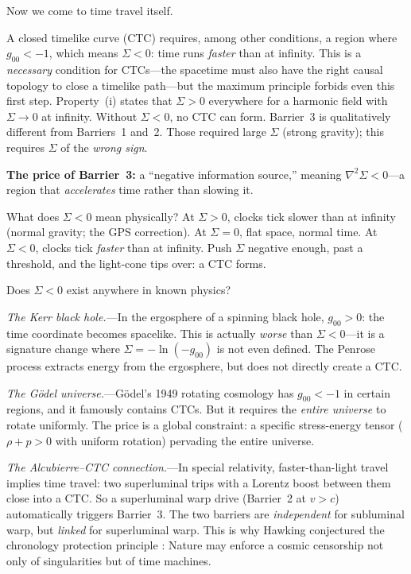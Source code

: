 \documentclass[12pt]{article}
\begin{document}
Now we come to time travel itself.

A closed timelike curve (CTC) requires, among other conditions, a
region where $g_{00} < -1$, which means $\Sigma < 0$: time runs
\emph{faster} than at infinity. This is a \emph{necessary} condition
for CTCs---the spacetime must also have the right causal topology to
close a timelike path---but the maximum principle forbids even this
first step. Property~(i) states that $\Sigma > 0$ everywhere for a
harmonic field with $\Sigma \to 0$ at infinity. Without $\Sigma < 0$,
no CTC can form. Barrier~3 is qualitatively different from Barriers~1
and~2. Those required large $\Sigma$ (strong gravity); this requires
$\Sigma$ of the \emph{wrong sign}.




\noindent\textbf{The price of Barrier~3:} a ``negative information
source,'' meaning $\nabla^2\Sigma < 0$---a region that \emph{accelerates}
time rather than slowing it.



What does $\Sigma < 0$ mean physically? At $\Sigma > 0$, clocks tick
slower than at infinity (normal gravity; the GPS correction). At
$\Sigma = 0$, flat space, normal time. At $\Sigma < 0$, clocks tick
\emph{faster} than at infinity. Push $\Sigma$ negative enough, past a
threshold, and the light-cone tips over: a CTC forms.

Does $\Sigma < 0$ exist anywhere in known physics?

\emph{The Kerr black hole.}---In the ergosphere of a spinning black
hole, $g_{00} > 0$: the time coordinate becomes spacelike. This is
actually \emph{worse} than $\Sigma < 0$---it is a signature change where
$\Sigma = -\ln(-g_{00})$ is not even defined. The Penrose process
extracts energy from the ergosphere, but does not directly create a CTC.

\emph{The G\"odel universe.}---G\"odel's 1949 rotating cosmology
\cite{Goedel1949} has $g_{00} < -1$ in certain regions, and it
famously contains CTCs. But it requires the \emph{entire universe} to
rotate uniformly. The price is a global constraint: a specific stress-energy tensor ($\rho + p > 0$ with uniform rotation) pervading the entire universe.

\emph{The Alcubierre--CTC connection.}---In special relativity,
faster-than-light travel implies time travel: two superluminal trips
with a Lorentz boost between them close into a CTC. So a superluminal
warp drive (Barrier~2 at $v > c$) automatically triggers Barrier~3.
The two barriers are \emph{independent} for subluminal warp, but
\emph{linked} for superluminal warp. This is why Hawking conjectured
the chronology protection principle \cite{Hawking1992}: Nature may
enforce a cosmic censorship not only of singularities but of time
machines.
\end{document}

